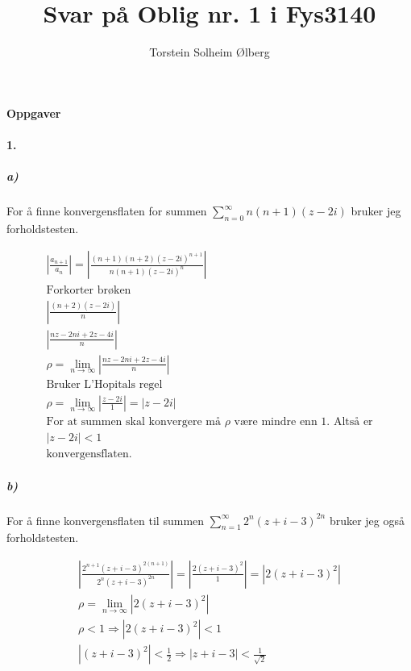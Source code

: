 \documentclass[11pt, A4paper, norsk]{article}
\author{Torstein Solheim Ølberg}
\title{Svar på Oblig nr. 1 i Fys3140}
\begin{document}
\maketitle
	\begin{center}
\Large \textbf{Oppgaver}
	\end{center}









		\paragraph{1.}
			\subparagraph{a)}
				\begin{flushleft}
For å finne konvergensflaten for summen $\sum_{n = 0}^{\infty} n(n + 1)(z - 2i)$ bruker jeg forholdstesten. 
				\end{flushleft}
				\begin{gather}
\left| \frac{a_{n + 1}}{a_{n}} \right| = \left| \frac{(n + 1)(n + 2)(z - 2i)^{n + 1}}{n(n + 1)(z - 2i)^{n}} \right| \\
\text{Forkorter brøken} \nonumber \\
\left| \frac{(n + 2)(z - 2i)}{n} \right| \\
\left| \frac{nz - 2ni + 2z - 4i}{n} \right| \\
\rho = \lim_{n \rightarrow \infty} \left| \frac{nz - 2ni + 2z - 4i}{n} \right| \\
\text{Bruker L'Hopitals regel} \nonumber \\
\rho = \lim_{n \rightarrow \infty} \left| \frac{z - 2i}{1} \right| = \left| z - 2i \right| \\
\text{For at summen skal konvergere må $\rho$ være mindre enn $1$. Altså er} \nonumber \\
\left| z - 2i \right| < 1 \\
\text{konvergensflaten.} \nonumber
				\end{gather}








			\subparagraph{b)}
				\begin{flushleft}
For å finne konvergensflaten til summen $\sum_{n = 1}^{\infty} 2^{n}(z + i - 3)^{2n}$ bruker jeg også forholdstesten.
				\end{flushleft}
				\begin{gather}
\left| \frac{2^{n + 1} (z + i - 3)^{2(n + 1)}}{2^{n}(z + i - 3)^{2n}} \right| = \left| \frac{2(z + i - 3)^{2}}{1} \right| = \left| 2(z + i - 3)^{2} \right| \\
\rho = \lim_{n \rightarrow \infty} \left| 2(z + i - 3)^{2} \right| \\
\rho < 1 \Rightarrow \left| 2(z + i - 3)^{2} \right| < 1 \\
\left| (z + i - 3)^{2} \right| < \frac{1}{2} \Rightarrow \left| z + i - 3 \right| < \frac{1}{\sqrt{2}}
				\end{gather}
\end{document}
